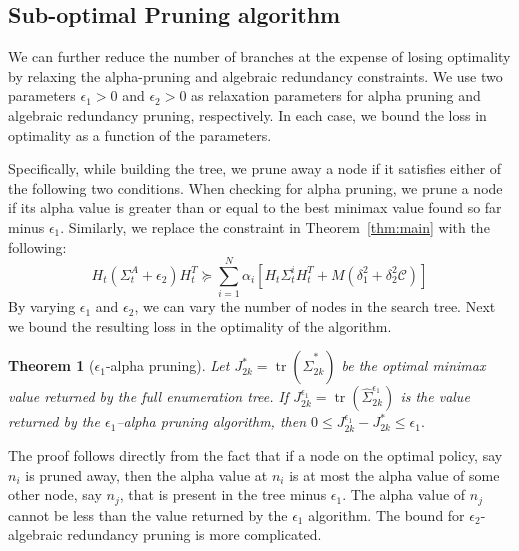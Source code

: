 \documentclass[journal]{IEEEtran}
\DeclareMathOperator{\Tr}{tr}
\newtheorem{theorem}{Theorem}
\begin{document}
\subsection{Sub-optimal Pruning algorithm}  
We can further reduce the number of branches at the expense of losing optimality by relaxing the alpha-pruning and algebraic redundancy constraints. We use two parameters $\epsilon_1 > 0$ and $\epsilon_2 > 0$ as relaxation parameters for alpha pruning and algebraic redundancy pruning, respectively. In each case, we bound the loss in optimality as a function of the parameters.

Specifically, while building the tree, we prune away a node if it satisfies either of the following two conditions.  When checking for alpha pruning, we prune a node if its alpha value is greater than or equal to the best minimax value found so far minus $\epsilon_1$. Similarly, we replace the constraint in Theorem~\ref{thm:main} with the following: 
\begin{equation}
  H_t(\Sigma_t^A+\epsilon_2)H_t^T \succeq  \sum^{N}_{i=1}\alpha_i \left[ H_t\Sigma_t^iH_t^T + M\left(\delta_1^2 +\delta_2^2\mathcal{C}\right)\right]
\end{equation}
By varying $\epsilon_1$ and $\epsilon_2$, we can vary the number of nodes in the search tree. Next we bound the resulting loss in the optimality of the algorithm.

\begin{theorem}[$\epsilon_1$-alpha pruning]
Let $J_{2k}^\ast=\Tr(\hat{\Sigma}_{2k}^\ast)$ be the optimal minimax value returned by the full enumeration tree. If $J_{2k}^{\epsilon_1}=\Tr(\hat{\Sigma}_{2k}^{\epsilon_1})$ is the value returned by the $\epsilon_1$--alpha pruning algorithm, then
$0\leq J_{2k}^{\epsilon_1}-J_{2k}^\ast\leq\epsilon_1.$
\end{theorem} 

The proof follows directly from the fact that if a node on the optimal policy, say $n_i$ is pruned away, then the alpha value at $n_i$ is at most the alpha value of some other node, say $n_j$, that is present in the tree minus $\epsilon_1$. The alpha value of $n_j$ cannot be less than the value returned by the $\epsilon_1$ algorithm. The bound for $\epsilon_2$-algebraic redundancy pruning is more complicated.
\end{document}
